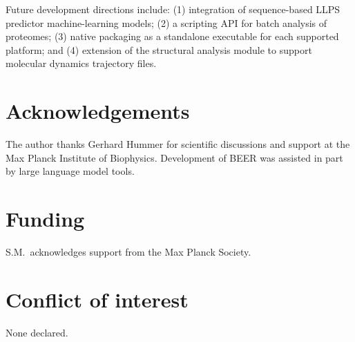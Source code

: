 \documentclass[12pt]{article}
\begin{document}
Future development directions include: (1) integration of sequence-based LLPS
predictor machine-learning models; (2) a scripting API for batch analysis of
proteomes; (3) native packaging as a standalone executable for each supported
platform; and (4) extension of the structural analysis module to support
molecular dynamics trajectory files.

\section*{Acknowledgements}

The author thanks Gerhard Hummer for scientific discussions and support at
the Max Planck Institute of Biophysics.
Development of BEER was assisted in part by large language model tools.

\section*{Funding}

S.M.\ acknowledges support from the Max Planck Society.

\section*{Conflict of interest}

None declared.
\end{document}
